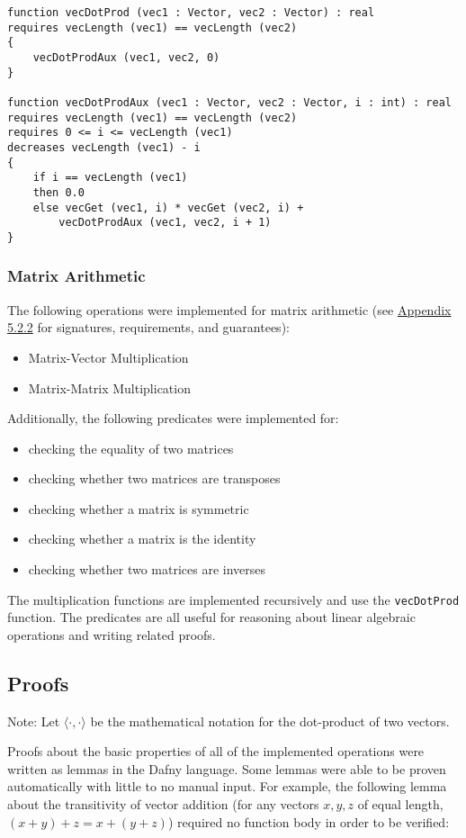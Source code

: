 \documentclass[12pt]{article}
\begin{document}
\begin{verbatim}
function vecDotProd (vec1 : Vector, vec2 : Vector) : real
requires vecLength (vec1) == vecLength (vec2)
{
    vecDotProdAux (vec1, vec2, 0)
}

function vecDotProdAux (vec1 : Vector, vec2 : Vector, i : int) : real
requires vecLength (vec1) == vecLength (vec2)
requires 0 <= i <= vecLength (vec1)
decreases vecLength (vec1) - i
{
    if i == vecLength (vec1)
    then 0.0
    else vecGet (vec1, i) * vecGet (vec2, i) +
        vecDotProdAux (vec1, vec2, i + 1)
}
\end{verbatim}

\subsubsection{Matrix Arithmetic}
The following operations were implemented for matrix arithmetic (see \hyperref[sec:matrixsigs]{Appendix 5.2.2} for signatures, requirements, and guarantees):
\begin{itemize}
\item Matrix-Vector Multiplication
\item Matrix-Matrix Multiplication
\end{itemize}

Additionally, the following predicates were implemented for:
\begin{itemize}
\item checking the equality of two matrices
\item checking whether two matrices are transposes
\item checking whether a matrix is symmetric
\item checking whether a matrix is the identity
\item checking whether two matrices are inverses
\end{itemize}

The multiplication functions are implemented recursively and use the \verb|vecDotProd| function. The predicates are all useful for reasoning about linear algebraic operations and writing related proofs.

\subsection{Proofs}
\label{sec:proofs}
Note: Let $\langle \cdot, \cdot \rangle$ be the mathematical notation for the dot-product of two vectors.

Proofs about the basic properties of all of the implemented operations were written as lemmas in the Dafny language. Some lemmas were able to be proven automatically with little to no manual input. For example, the following lemma about the transitivity of vector addition (for any vectors $x, y, z$ of equal length, $(x + y) + z = x + (y + z)$) required no function body in order to be verified:
\end{document}
